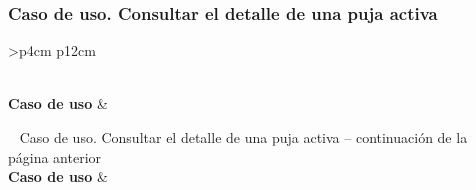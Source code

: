 \subsubsection{Caso de uso. Consultar el detalle de una puja activa} \label{sec:cu_consultar-detalle-puja}
\begin{longtable}{
    >{}p{4cm}
    p{12cm}
    }
    \caption{Caso de uso. Consultar el detalle de una puja activa} \label{table:cu_consultar-detalle-puja} \\
    \toprule
    \textbf{Caso de uso} &  \\
    \endfirsthead
    
    {{ \tablename\ \thetable{} Caso de uso. Consultar el detalle de una puja activa -- continuación de la página anterior}} \\
    \toprule
    \textbf{Caso de uso} &  \\
    \midrule
    \endhead
    
    \midrule
     \\ 
    \endfoot
    
    \bottomrule
    \endlastfoot
    

\end{longtable}
